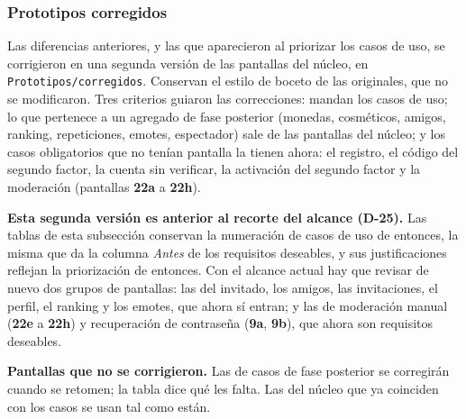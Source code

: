 \subsubsection*{Prototipos corregidos}
Las diferencias anteriores, y las que aparecieron al priorizar los casos de uso, se corrigieron en una segunda versión de las pantallas del núcleo, en \texttt{Prototipos/corregidos}. Conservan el estilo de boceto de las originales, que no se modificaron. Tres criterios guiaron las correcciones: mandan los casos de uso; lo que pertenece a un agregado de fase posterior (monedas, cosméticos, amigos, ranking, repeticiones, emotes, espectador) sale de las pantallas del núcleo; y los casos obligatorios que no tenían pantalla la tienen ahora: el registro, el código del segundo factor, la cuenta sin verificar, la activación del segundo factor y la moderación (pantallas \textbf{22a} a \textbf{22h}).

\textbf{Esta segunda versión es anterior al recorte del alcance (\mbox{D-25}).} Las tablas de esta subsección conservan la numeración de casos de uso de entonces, la misma que da la columna \textit{Antes} de los requisitos deseables, y sus justificaciones reflejan la priorización de entonces. Con el alcance actual hay que revisar de nuevo dos grupos de pantallas: las del invitado, los amigos, las invitaciones, el perfil, el ranking y los emotes, que ahora sí entran; y las de moderación manual (\textbf{22e} a \textbf{22h}) y recuperación de contraseña (\textbf{9a}, \textbf{9b}), que ahora son requisitos deseables.



\textbf{Pantallas que no se corrigieron.} Las de casos de fase posterior se corregirán cuando se retomen; la tabla dice qué les falta. Las del núcleo que ya coinciden con los casos se usan tal como están.




\par
